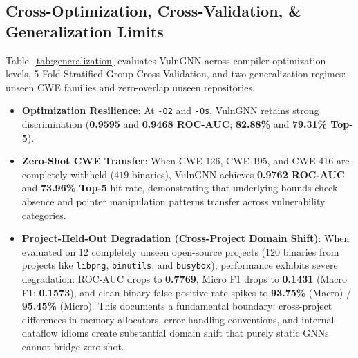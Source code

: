 \documentclass[10pt,conference]{IEEEtran}
\begin{document}
\subsection{Cross-Optimization, Cross-Validation, & Generalization Limits}
Table~\ref{tab:generalization} evaluates VulnGNN across compiler optimization levels, 5-Fold Stratified Group Cross-Validation, and
two generalization regimes: unseen CWE families and zero-overlap unseen repositories.
\begin{itemize}
  \item \textbf{Optimization Resilience}: At \texttt{-O2} and \texttt{-Os}, VulnGNN retains strong discrimination (\textbf{0.9595} and \textbf{0.9468 ROC-AUC}; \textbf{82.88\%} and \textbf{79.31\% Top-5}).
  \item \textbf{Zero-Shot CWE Transfer}: When CWE-126, CWE-195, and CWE-416 are completely withheld ($419$ binaries), VulnGNN achieves \textbf{0.9762 ROC-AUC} and \textbf{73.96\% Top-5} hit rate, demonstrating that underlying bounds-check absence and pointer manipulation patterns transfer across vulnerability categories.
  \item \textbf{Project-Held-Out Degradation (Cross-Project Domain Shift)}: When evaluated on 12 completely unseen open-source projects ($120$ binaries from projects like \texttt{libpng}, \texttt{binutils}, and \texttt{busybox}), performance exhibits severe degradation: ROC-AUC drops to \textbf{0.7769}, Micro F1 drops to \textbf{0.1431} (Macro F1: \textbf{0.1573}), and clean-binary false positive rate spikes to \textbf{93.75\%} (Macro) / \textbf{95.45\%} (Micro). This documents a fundamental boundary: cross-project differences in memory allocators, error handling conventions, and internal dataflow idioms create substantial domain shift that purely static GNNs cannot bridge zero-shot.
\end{itemize}
\end{document}
